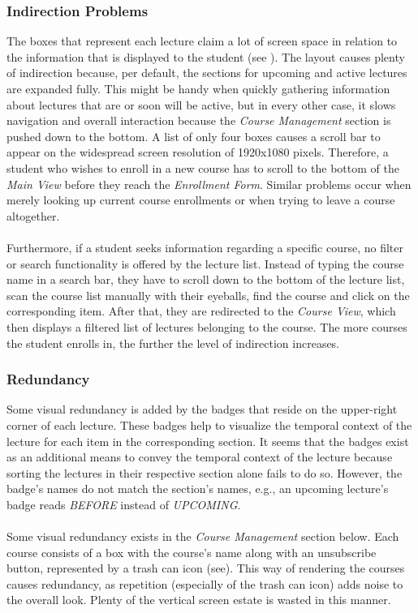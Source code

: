 \subsubsection{Indirection Problems}

The boxes that represent each lecture claim a lot of screen space in relation to the information that is displayed to the student (see ). The layout causes plenty of indirection because, per default, the sections for upcoming and active lectures are expanded fully. This might be handy when quickly gathering information about lectures that are or soon will be active, but in every other case, it slows navigation and overall interaction because the \emph{Course Management} section is pushed down to the bottom.
A list of only four boxes causes a scroll bar to appear on the widespread screen resolution of 1920x1080 pixels. Therefore, a student who wishes to enroll in a new course has to scroll to the bottom of the \emph{Main View}  before they reach the \emph{Enrollment Form}. Similar problems occur when merely looking up current course enrollments or when trying to leave a course altogether. 
\\
\\
Furthermore, if a student seeks information regarding a specific course, no filter or search functionality is offered by the lecture list. Instead of typing the course name in a search bar, they have to scroll down to the bottom of the lecture list, scan the course list manually with their eyeballs, find the course and click on the corresponding item. After that, they are redirected to the \emph{Course View}, which then displays a filtered list of lectures belonging to the course. The more courses the student enrolls in, the further the level of indirection increases. 

\subsubsection{Redundancy}

Some visual redundancy is added by the badges that reside on the upper-right corner of each lecture. These badges help to visualize the temporal context of the lecture for each item in the corresponding section. It seems that the badges exist as an additional means to convey the temporal context of the lecture because sorting the lectures in their respective section alone fails to do so.
However, the badge's names do not match the section's names, e.g., an upcoming lecture's badge reads \emph{BEFORE} instead of \emph{UPCOMING}. 
\\
\\
Some visual redundancy exists in the \emph{Course Management} section below. Each course consists of a box with the course's name along with an unsubscribe button, represented by a trash can icon (see). This way of rendering the courses causes redundancy, as repetition (especially of the trash can icon) adds noise to the overall look. Plenty of the vertical screen estate is wasted in this manner.
